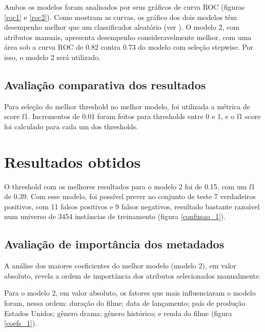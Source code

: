         Ambos os modelos foram analisados por seus gráficos de curva ROC (figuras \ref{roc1} e \ref{roc2}). Como mostram as curvas, os gráfico dos dois modelos têm desempenho melhor que um classificador aleatório (ver ). O modelo 2, com atributos manuais, apresenta desempenho consideravelmente melhor, com uma área sob a curva ROC de 0.82 contra 0.73 do modelo com seleção stepwise. Por isso, o modelo 2 será utilizado.

        \subsection{Avaliação comparativa dos resultados}\par
        Para seleção do melhor threshold no melhor modelo, foi utilizada a métrica de score f1. Incrementos de 0.01 foram feitos para thresholds entre 0 e 1, e o f1 score foi calculado para cada um dos thresholds.
        
    \section{Resultados obtidos}
        
        O threshold com os melhores resultados para o modelo 2 foi de 0.15, com um f1 de 0.39. Com esse modelo, foi possível prever no conjunto de teste 7 verdadeiros positivos, com 11 falsos positivos e 9 falsos negativos, resultado bastante razoável num universo de 3454 instâncias de treinamento (figura \ref{confusao_1}).

        \subsection{Avaliação de importância dos metadados}\par
        A análise dos maiores coeficientes do melhor modelo (modelo 2), em valor absoluto, revela a ordem de importância dos atributos selecionados manualmente.
        
        Para o modelo 2, em valor absoluto, os fatores que mais influenciaram o modelo foram, nessa ordem: duração do filme; data de lançamento; país de produção Estados Unidos; gênero drama; gênero histórico; e renda do filme (figura \ref{coefs_1}).\par